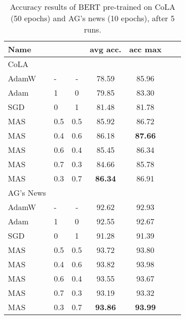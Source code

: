 \documentclass[10pt,twocolumn,letterpaper]{article}
\begin{document}
\begin{table}
    \caption{Accuracy results of BERT pre-trained on CoLA (50 epochs) and AG's news (10 epochs), after 5 runs.}
    \label{tab:accuracyCoLA}
    \begin{center}
        \begin{tabular}{llccccc} 
            \hline
            Name &  &  & avg acc. & acc max\\
            \hline
            CoLA &  & & \\
            \hline
            AdamW & - & - & 78.59 & 85.96 \\
            Adam & 1 & 0 & 79.85 & 83.30 \\
            SGD & 0 & 1 & 81.48  & 81.78 \\
            MAS & 0.5 & 0.5 & 85.92 & 86.72 \\
            MAS & 0.4 & 0.6 & 86.18 & \textbf{87.66} \\
            MAS & 0.6 & 0.4 & 85.45 & 86.34  \\
            MAS & 0.7 & 0.3 & 84.66 & 85.78 \\
            MAS & 0.3 & 0.7 & \textbf{86.34} & 86.91  \\
            \hline
            AG's News & & & \\
            \hline
            AdamW & - & - & 92.62 & 92.93 \\
            Adam & 1 & 0 & 92.55 &  92.67 \\
            SGD & 0 & 1 & 91.28 & 91.39\\
            MAS & 0.5 & 0.5 & 93.72 & 93.80 \\
            MAS & 0.4 & 0.6 & 93.82 & 93.98 \\
            MAS & 0.6 & 0.4 & 93.55 & 93.67 \\
            MAS & 0.7 & 0.3 & 93.19 & 93.32 \\
            MAS & 0.3 & 0.7 & \textbf{93.86} & \textbf{93.99} \\
            \hline
        \end{tabular}
    \end{center}
\end{table}
\end{document}
